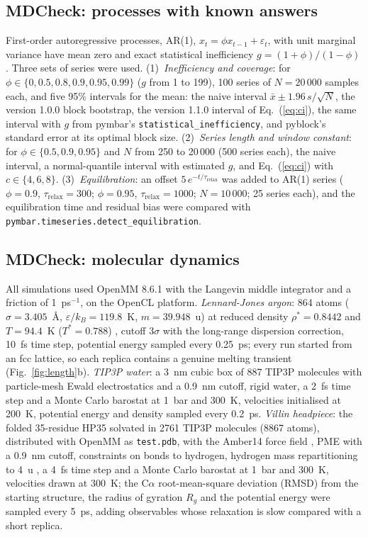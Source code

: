 \documentclass[9pt,lessons]{livecoms}
\begin{document}
\subsection{MDCheck: processes with known answers}
First-order autoregressive processes, AR(1), $x_t = \phi x_{t-1} + \varepsilon_t$, with unit marginal variance have mean zero and exact statistical inefficiency $g = (1+\phi)/(1-\phi)$. Three sets of series were used. (1)~\emph{Inefficiency and coverage}: for $\phi \in \{0, 0.5, 0.8, 0.9, 0.95, 0.99\}$ ($g$ from 1 to 199), 100 series of $N = 20\,000$ samples each, and five 95\% intervals for the mean: the naive interval $\bar{x} \pm 1.96\,s/\sqrt{N}$, the version 1.0.0 block bootstrap, the version 1.1.0 interval of Eq.~(\ref{eq:ci}), the same interval with $g$ from pymbar's \texttt{statistical\_inefficiency}, and pyblock's standard error at its optimal block size. (2)~\emph{Series length and window constant}: for $\phi \in \{0.5, 0.9, 0.95\}$ and $N$ from 250 to 20\,000 (500 series each), the naive interval, a normal-quantile interval with estimated $g$, and Eq.~(\ref{eq:ci}) with $c \in \{4, 6, 8\}$. (3)~\emph{Equilibration}: an offset $5\,e^{-t/\tau_{\mathrm{relax}}}$ was added to AR(1) series ($\phi = 0.9$, $\tau_{\mathrm{relax}} = 300$; $\phi = 0.95$, $\tau_{\mathrm{relax}} = 1000$; $N = 10\,000$; 25 series each), and the equilibration time and residual bias were compared with \texttt{pymbar.timeseries.detect\_equilibration}.

\subsection{MDCheck: molecular dynamics}
All simulations used OpenMM 8.6.1 \cite{eastman2024openmm} with the Langevin middle integrator \cite{zhang2019} and a friction of 1~ps$^{-1}$, on the OpenCL platform. \emph{Lennard-Jones argon}: 864 atoms ($\sigma = 3.405$~\AA, $\varepsilon/k_B = 119.8$~K, $m = 39.948$~u) at reduced density $\rho^* = 0.8442$ and $T = 94.4$~K ($T^* = 0.788$) \cite{verlet1967}, cutoff $3\sigma$ with the long-range dispersion correction, 10~fs time step, potential energy sampled every 0.25~ps; every run started from an fcc lattice, so each replica contains a genuine melting transient (Fig.~\ref{fig:length}b). \emph{TIP3P water}: a 3~nm cubic box of 887 TIP3P molecules \cite{jorgensen1983} with particle-mesh Ewald electrostatics \cite{essmann1995} and a 0.9~nm cutoff, rigid water, a 2~fs time step and a Monte Carlo barostat \cite{aqvist2004} at 1~bar and 300~K, velocities initialised at 200~K, potential energy and density sampled every 0.2~ps. \emph{Villin headpiece}: the folded 35-residue HP35 solvated in 2761 TIP3P molecules (8867 atoms), distributed with OpenMM as \texttt{test.pdb}, with the Amber14 force field \cite{maier2015ff14sb}, PME with a 0.9~nm cutoff, constraints on bonds to hydrogen, hydrogen mass repartitioning to 4~u \cite{hopkins2015}, a 4~fs time step and a Monte Carlo barostat at 1~bar and 300~K, velocities drawn at 300~K; the C$\alpha$ root-mean-square deviation (RMSD) from the starting structure, the radius of gyration $R_g$ and the potential energy were sampled every 5~ps, adding observables whose relaxation is slow compared with a short replica.
\end{document}
